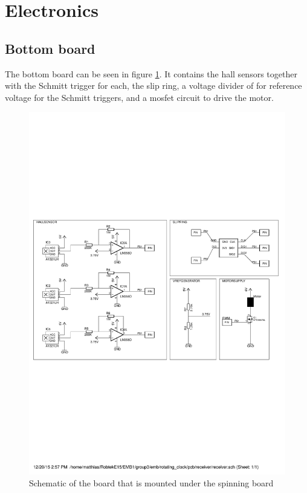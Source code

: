\section{Electronics}
 
\subsection{Bottom board}
The bottom board can be seen in figure \ref{fig:botm_schematic}.
It contains the hall sensors together with the Schmitt trigger for each, the slip ring, a voltage divider of for reference voltage for the Schmitt triggers, and a mosfet circuit to drive the motor. 
\begin{figure}[h]
 \centering
 \includegraphics[scale=0.7,trim = 0 9cm 0 8cm,clip = true]{img/bottompcb_schematic}
 \caption{Schematic of the board that is mounted under the spinning board}
 \label{fig:botm_schematic}
\end{figure}

